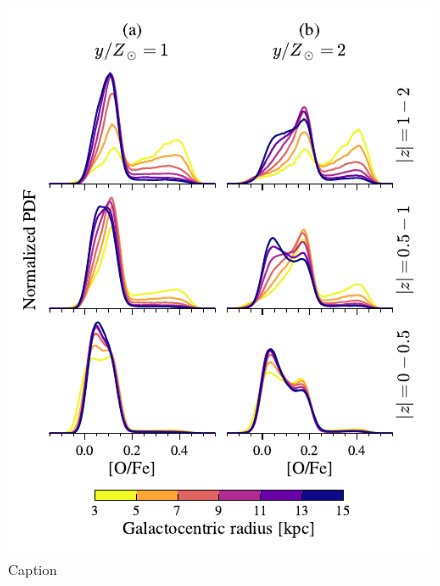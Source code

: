 \documentclass[twocolumn,twocolappendix,linenumbers]{aastex631}
\begin{document}
\begin{figure}
    \centering
    \includegraphics[width=\linewidth]{src/tex/figures/ofe_distribution_yields.pdf}
    \caption{Caption}
    \label{fig:ofe-distribution-yields}
\end{figure}
\end{document}
